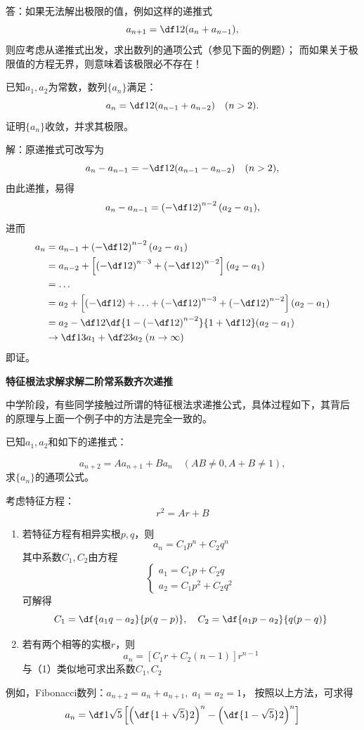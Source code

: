 \ifhint
答：如果无法解出极限的值，例如这样的递推式
$$a_{n+1}=\df12(a_n+a_{n-1}),$$
则应考虑从递推式出发，求出数列的通项公式（参见下面的例题）；
而如果关于极限值的方程无界，则意味着该极限必不存在！
\fi

\bs
\egz 已知$a_1,a_2$为常数，数列$\{a_n\}$满足：
$$a_n=\df 12({a_{n-1}+a_{n-2}})\quad(n>2).$$
证明$\{a_n\}$收敛，并求其极限。

解：原递推式可改写为
$$a_n-a_{n-1}=-\df12(a_{n-1}-a_{n-2})\quad(n>2),$$
由此递推，易得
$$a_n-a_{n-1}=\left(-\df12\right)^{n-2}(a_2-a_1),$$
进而
\begin{align}
	a_n&=a_{n-1}+\left(-\df12\right)^{n-2}(a_2-a_1)\notag\\
	&=a_{n-2}+\left[\left(-\df12\right)^{n-3}+\left(-\df12\right)^{n-2}\right]
	(a_2-a_1)\notag\\
	&=\ldots\notag\\
	&=a_2+\left[\left(-\df12\right)+\ldots+\left(-\df12\right)^{n-3}
	+\left(-\df12\right)^{n-2}\right](a_2-a_1)\notag\\
	&=a_2-\df12\df{1-\left(-\df12\right)^{n-2}}{1+\df12}(a_2-a_1)\notag\\
	&\to\df13a_1+\df23a_2\;(n\to\infty)\notag
\end{align}
即证。\fin

\begin{shaded}
	{\bf 特征根法求解求解二阶常系数齐次递推}

	中学阶段，有些同学接触过所谓的特征根法求递推公式，具体过程如下，其背后
	的原理与上面一个例子中的方法是完全一致的。

	已知$a_1,a_2$和如下的递推式：

	$$a_{n+2}=Aa_{n+1}+Ba_n\quad (AB\ne 0, A+B\ne 1),$$
	求$\{a_n\}$的通项公式。

	考虑特征方程：
	$$r^2=Ar+B$$
	\begin{enumerate}[(1)]
	  \setlength{\itemindent}{1cm}
	  \item 若特征方程有相异实根$p,q$，则
	  $$a_n=C_1p^n+C_2q^n$$
	  其中系数$C_1,C_2$由方程
	  $$\left\{\begin{array}{l}
	  a_1=C_1p+C_2q\\
	  a_2=C_1p^2+C_2q^2
	  \end{array}\right.$$
	  可解得
	  $$C_1=\df{a_1q-a_2}{p(q-p)},\quad
	  C_2=\df{a_1p-a_2}{q(p-q)}$$
	  \item 若有两个相等的实根$r$，则
	  $$a_n=[C_1r+C_2(n-1)]r^{n-1}$$
	  与（1）类似地可求出系数$C_1,C_2$
	\end{enumerate}

	例如，Fibonacci数列：$a_{n+2}=a_n+a_{n+1},\;a_1=a_2=1$，
	按照以上方法，可求得
	$$a_n=\df1{\sqrt5}\left[\left(\df{1+\sqrt5}2\right)^n
	-\left(\df{1-\sqrt5}2\right)^n\right]$$
\end{shaded}

